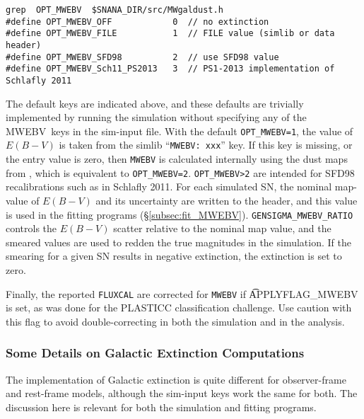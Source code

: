 \documentclass[12pt]{article}
\newcommand{\mwebv}{MWEBV}
\begin{document}
{\begin{Verbatim}[frame=single]
grep  OPT_MWEBV  $SNANA_DIR/src/MWgaldust.h
#define OPT_MWEBV_OFF            0  // no extinction
#define OPT_MWEBV_FILE           1  // FILE value (simlib or data header)
#define OPT_MWEBV_SFD98          2  // use SFD98 value
#define OPT_MWEBV_Sch11_PS2013   3  // PS1-2013 implementation of Schlafly 2011
\end{Verbatim}
The default keys are indicated above, and these defaults are 
trivially implemented by running the simulation without specifying
any of the \mwebv\ keys in the sim-input file.
With the default {\tt OPT\_MWEBV=1},
the value of $E(B-V)$ is taken from the simlib 
``{\tt MWEBV: xxx}'' key. If this key is missing,
or the entry value is zero, then {\tt MWEBV} is calculated
internally using the dust maps from \cite{Schlegel_98},
which is equivalent to {\tt OPT\_MWEBV=2}.
{\tt OPT\_MWEBV>2} are intended for SFD98 recalibrations
such as in Schlafly 2011. 
For each simulated SN, the nominal map-value of $E(B-V)$ and its
uncertainty are written to the header, and this value is used
in the fitting programs (\S\ref{subsec:fit_MWEBV}).
{\tt GENSIGMA\_MWEBV\_RATIO} controls the $E(B-V)$ scatter
relative to the nominal map value,
and the smeared values are used to redden the true
magnitudes in the simulation.
If the smearing for a given SN results in negative extinction, 
the extinction is set to zero.

Finally, the reported {\tt FLUXCAL} are corrected for {\tt MWEBV}
if {\t APPLYFLAG\_MWEBV} is set, as was done for the PLASTICC 
classification challenge. Use caution with this flag to avoid
double-correcting in both the simulation and in the analysis.

\subsubsection{Some Details on Galactic Extinction Computations}
\label{sss:GALextinc_misc}

The implementation of Galactic extinction is quite different
for observer-frame and rest-frame models, although the 
sim-input keys work the same for both.
The discussion here is relevant for both the simulation
and fitting programs.

}
\end{document}
